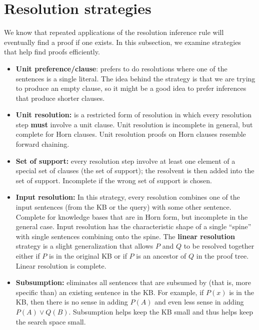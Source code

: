 \section{Resolution strategies}
We know that repeated applications of the resolution inference rule will eventually find a proof if one exists. In this subsection, we examine strategies that help find proofs efficiently.
\begin{itemize}
    \item \textbf{Unit preference/clause}: prefers to do resolutions where one of the sentences is a single literal.  The idea behind the strategy is that we are trying to produce an empty clause, so it might be a good idea to prefer inferences that produce shorter clauses.

    \item \textbf{Unit resolution:} is a restricted form of resolution in which every resolution step \textbf{must} involve a unit clause. Unit resolution is incomplete in general, but complete for Horn clauses. Unit resolution proofs on Horn clauses resemble forward chaining.

    \item \textbf{Set of support:} every resolution step involve at least one element of a special set of clauses (the set of support); the resolvent is then added into the set of support. Incomplete if the wrong set of support is chosen.

    \item \textbf{Input resolution:} In this strategy, every resolution combines one of the input sentences (from the KB or the query) with some other sentence. Complete for knowledge bases that are in Horn form, but incomplete in the general case. Input resolution has the characteristic shape of a single “spine” with single sentences combining onto the spine. The \textbf{linear resolution} strategy is a slight generalization that allows $P$ and $Q$ to be resolved together either if $P$ is in the original KB or if $P$ is an ancestor of $Q$ in the proof tree. Linear resolution is complete.

    \item \textbf{Subsumption:} eliminates all sentences that are subsumed by (that is, more specific than) an existing sentence in the KB. For example, if $P(x)$ is in the KB, then there is no sense in adding $P(A)$ and even less sense in adding $P(A) \lor Q(B)$. Subsumption helps keep the KB small and thus helps keep the search space small.

\end{itemize}
